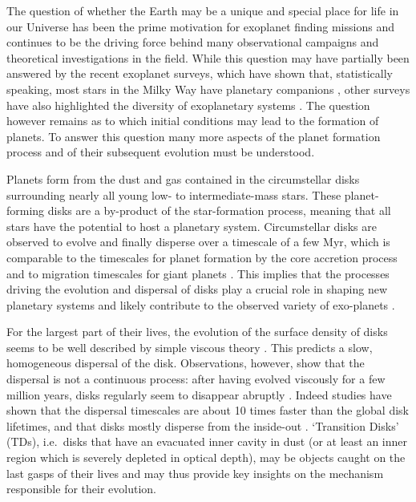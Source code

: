 \documentclass[10pt,fleqn,twoside]{article}
\begin{document}
The question of whether the Earth may be a unique and special place for life
in our Universe has been the prime motivation for exoplanet finding missions
and continues to be the driving force behind many observational campaigns and
theoretical investigations in the field. While this question may have
partially been answered by the recent exoplanet surveys, which have shown
 that, statistically speaking, most stars in the Milky Way have planetary
  companions \citep{2012Natur.481..167C}, other surveys have
also highlighted the diversity of exoplanetary systems \citep{2015ApJS..217...31M}. 
The question however remains as to which
initial conditions may lead to the formation of planets. To answer
this question many more aspects of the planet formation process and of their
subsequent evolution must be understood.

Planets form from the dust and gas contained in the circumstellar disks surrounding nearly all young low- to intermediate-mass stars. These planet-forming disks are a by-product of the star-formation process, meaning that all stars have the potential to host a planetary system.
Circumstellar disks are observed to evolve and finally disperse over a
timescale of a few Myr, which is comparable to
the timescales for planet formation by the core accretion process
 and to migration timescales for giant planets
\citep[see][for a review]{2011ARA&A..49..195A}. This implies that the processes driving the
evolution and dispersal of disks play a crucial role in shaping new
planetary systems and likely contribute to the observed variety of exo-planets
\citep[see e.g.,]{2012MNRAS.422L..82A, 2015MNRAS.450.3008E}.

For the largest part
of their lives, the evolution of the surface density of disks seems to be well
described by simple viscous theory 
\citep[e.g.][]{1998ApJ...495..385H, 1974MNRAS.168..603L}.
This predicts a slow, homogeneous dispersal of the
disk. Observations, however, show that the dispersal is not a
continuous process: after having evolved viscously for a few million
years, disks regularly seem to disappear abruptly 
\citep[e.g.,][]{1995ApJS..101..117K, 2010ApJS..186..111L}.
Indeed studies have shown that the dispersal
timescales are about 10 times faster than the global disk lifetimes, and
that disks mostly disperse from the inside-out 
\citep[e.g.,][]{2011MNRAS.410..671E, 2013MNRAS.428.3327K}. 
`Transition Disks' (TDs), i.e.\ disks
that have an evacuated inner cavity in dust (or at least an inner region
which is severely depleted in optical depth), may be objects caught on
the last gasps of their lives and may thus provide key insights on the
mechanism responsible for their evolution. 
\end{document}
